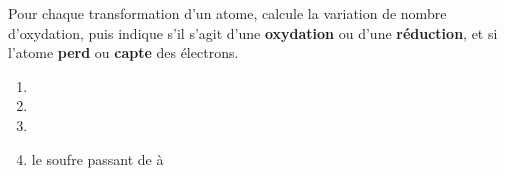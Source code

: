\documentclass[11pt,a4paper]{article}
\begin{document}
\begin{exo}
Pour chaque transformation d'un atome, calcule la variation de nombre d'oxydation, puis indique s'il
s'agit d'une \textbf{oxydation} ou d'une \textbf{réduction}, et si l'atome \textbf{perd} ou
\textbf{capte} des électrons.
\begin{enumerate}[label=\alph*)]
  \item {}
  \item {}
  \item {}
  \item le soufre passant de  à 
\end{enumerate}
\end{exo}
\end{document}
